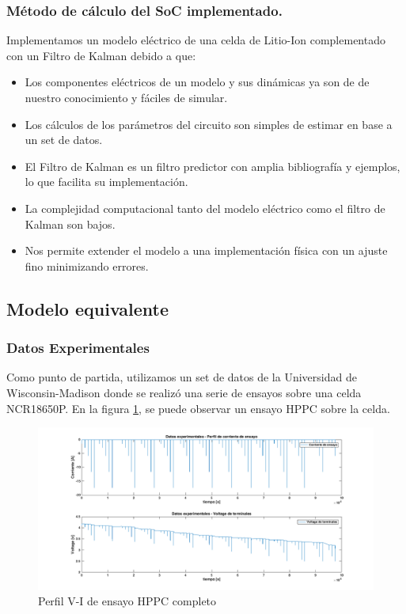 \documentclass[10pt]{beamer}
\theoremstyle{remark}
\theoremstyle{definition}
\begin{document}
\begin{frame}[allowframebreaks]
    \frametitle{ M\'etodo de c\'alculo del SoC implementado.}
    Implementamos  un modelo eléctrico de una celda de Litio-Ion complementado
    con un Filtro de Kalman debido a que:
  	\begin{itemize}
		\item Los componentes eléctricos de un modelo y sus dinámicas ya son de
	  		de nuestro conocimiento y f\'aciles de simular.
		\item Los c\'alculos de los parámetros del circuito son simples de estimar en
	  		base a un set de datos.
        \item El Filtro de Kalman es un filtro predictor con amplia
            bibliograf\'ia y ejemplos, lo que facilita su implementación.
		\item La complejidad computacional tanto del modelo el\'ectrico como el filtro
	 		de Kalman son bajos.
		\item Nos permite extender el modelo a una implementación f\'isica con un
	  		ajuste fino minimizando errores.
  	\end{itemize}
\end{frame}

\subsection{Modelo equivalente}
\begin{frame}
	\frametitle{Datos Experimentales}
	Como punto de partida, utilizamos un set de datos 
	de la Universidad de Wisconsin-Madison donde se realizó una serie de 
	ensayos sobre una celda NCR18650P. En la figura \ref{fig:perfildeensayohppc},
	se puede observar un ensayo HPPC sobre la celda.
  	\begin{figure}
		\centering
		\includegraphics[width=1\linewidth]{images/HPPC-Completo}
		\caption{Perfil V-I de ensayo HPPC completo}
		\label{fig:perfildeensayohppc}
   	\end{figure}
\end{frame}
\end{document}
